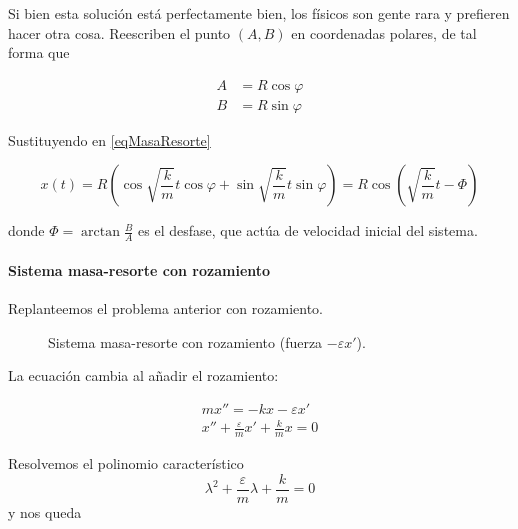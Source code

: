 \documentclass[nochap]{apuntes}
\begin{document}
Si bien esta solución está perfectamente bien, los físicos son gente rara y prefieren hacer otra cosa. Reescriben el punto $(A,B)$ en coordenadas polares, de tal forma que

\begin{align*}
A &= R\cos φ \\
B &= R\sin φ 
\end{align*}

Sustituyendo en \eqref{eqMasaResorte}

\[ x(t) = R\left(\cos \sqrt{\frac{k}{m}} t\cos φ + \sin \sqrt{\frac{k}{m}} t \sin φ \right) = R\cos\left(\sqrt{\frac{k}{m}}t - Φ\right) \]

donde $Φ = \arctan \frac{B}{A}$ es el desfase, que actúa de velocidad inicial del sistema.

\paragraph{Sistema masa-resorte con rozamiento}

Replanteemos el problema anterior con rozamiento.
\begin{figure}
\centering
{}
\caption{Sistema masa-resorte con rozamiento (fuerza $-εx'$).}
\end{figure}

La ecuación cambia al añadir el rozamiento:

\begin{gather} mx'' = -kx - εx' \nonumber \\
x'' + \frac{ε}{m}x' + \frac{k}{m}x = 0
\end{gather}

Resolvemos el polinomio característico \[ λ^2 + \frac{ε}{m}λ + \frac{k}{m} = 0 \] y nos queda
\end{document}
